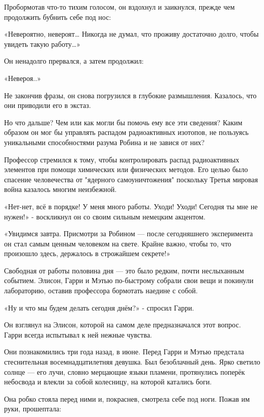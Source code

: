 \documentclass[a4paper,12pt]{book}
\begin{document}
\par
Пробормотав что-то тихим голосом, он вздохнул и заикнулся, прежде чем продолжить бубнить себе под нос:
\par
«Невероятно, невероят… Никогда не думал, что проживу достаточно долго, чтобы увидеть такую работу…»
\par
Он ненадолго прервался, а затем продолжил:
\par
«Невероя..»
\par
Не закончив фразы, он снова погрузился в глубокие размышления. Казалось, что они приводили его в экстаз.
\par
Но что дальше? Чем или как могли бы помочь ему все эти сведения? Каким образом он мог бы управлять распадом радиоактивных изотопов, не пользуясь уникальными способностями разума Робина и не завися от них?
\par
Профессор стремился к тому, чтобы контролировать распад радиоактивных элементов при помощи химических или физических методов. Его целью было спасение человечества от "ядерного самоуничтожения" поскольку Третья мировая война казалось многим неизбежной.\\
\par
«Нет-нет, всё в порядке! У меня много работы. Уходи! Уходи! Сегодня ты мне не нужен!» - воскликнул он со своим сильным немецким акцентом.
\par
«Увидимся завтра. Присмотри за Робином — после сегодняшнего эксперимента он стал самым ценным человеком на свете. Крайне важно, чтобы то, что произошло здесь, держалось в строжайшем секрете!»
\par
Свободная от работы половина дня — это было редким, почти неслыханным событием. Элисон, Гарри и Мэтью по-быстрому собрали свои вещи и покинули лабораторию, оставив профессора бормотать наедине с собой.\\
\par
«Ну и что мы будем делать сегодня днём?» - спросил Гарри.
\par
Он взглянул на Элисон, которой на самом деле предназначался этот вопрос. Гарри всегда испытывал к ней нежные чувства.
\par
Они познакомились три года назад, в июне. Перед Гарри и Мэтью предстала стеснительная восемнадцатилетняя девушка. Был безоблачный день. Ярко светило солнце — его лучи, словно мерцающие языки пламени, протянулись поперёк небосвода и влекли за собой колесницу, на которой катались боги.
\par
Она робко стояла перед ними и, покраснев, смотрела себе под ноги. Пожав им руки, прошептала:
\end{document}
